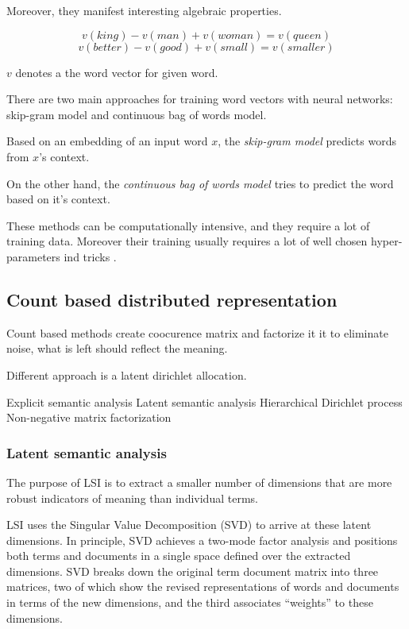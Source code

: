         Moreover, they manifest interesting algebraic properties. 
        
        $$v(king) - v(man) + v(woman) = v(queen)$$
        $$v(better) - v(good) + v(small) = v(smaller)$$
        
        $v$ denotes a the word vector for given word.
        
        There are two main approaches for training word vectors with neural networks: skip-gram model and continuous bag of words model.
        
        Based on an embedding of an input word $x$, the \textit{skip-gram model} predicts words from $x$'s context.
        
        On the other hand, the \textit{continuous bag of words model} tries to predict the word based on it's context.
        
        These methods can be computationally intensive, and they require a lot of training data. 
        Moreover their training usually requires a lot of well chosen hyper-parameters ind tricks \cite{DBLP:journals/corr/MikolovSCCD13}. %
        

        \subsection{Count based distributed representation}
        \* %
        
        Count based methods create coocurence matrix and factorize it it to eliminate noise, 
        what is left should reflect the meaning. 
        
        Different approach is a latent dirichlet allocation.
        
        Explicit semantic analysis
        Latent semantic analysis
        Hierarchical Dirichlet process
        Non-negative matrix factorization
        
        
        \subsubsection{Latent semantic analysis}
        
        The purpose of LSI is to extract a smaller number of dimensions that are more robust indicators of meaning than individual terms.  
        
        LSI uses the Singular Value Decomposition (SVD) to arrive at these latent dimensions. In principle, SVD achieves a two-mode factor analysis and positions both terms and documents in a single space defined over the extracted dimensions. 
        SVD breaks down the original term document matrix into three matrices, two of which show the revised representations of words and documents in terms of the new dimensions, 
        and the third associates “weights” to these dimensions. 
        
